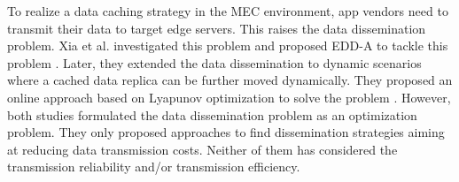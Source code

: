 \documentclass[10pt,journal,compsoc]{IEEEtran}
\begin{document}
To realize a data caching strategy in the MEC environment, app vendors need to transmit their data to target edge servers. This raises the data dissemination problem. Xia et al. investigated this problem and proposed EDD-A to tackle this problem \cite{xia2021cost}.  Later, they extended the data dissemination to dynamic scenarios where a cached data replica can be further moved dynamically. They proposed an online approach based on Lyapunov optimization to solve the problem \cite{xia2022formulating}. However, both studies formulated the data dissemination problem as an optimization problem. They only proposed approaches to find dissemination strategies aiming at reducing data transmission costs. Neither of them has considered the transmission reliability and/or transmission efficiency. 


\setlength{\textfloatsep}{4pt}
\begin{table}[bt]
\renewcommand{\arraystretch}{1.1}
    \caption{Limitations of Potential EDD Schemes}   
    \vspace{-1em} 
    \label{Tab:Characteristics}
    \centering
\end{table}
\end{document}
